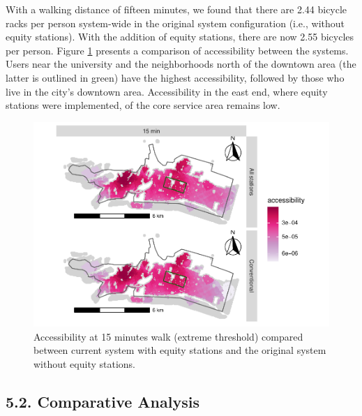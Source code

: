 \documentclass[]{elsarticle} %
\begin{document}
With a walking distance of fifteen minutes, we found that there are 2.44
bicycle racks per person system-wide in the original system
configuration (i.e., without equity stations). With the addition of
equity stations, there are now 2.55 bicycles per person. Figure
\ref{fig:figure-9} presents a comparison of accessibility between the
systems. Users near the university and the neighborhoods north of the
downtown area (the latter is outlined in green) have the highest
accessibility, followed by those who live in the city's downtown area.
Accessibility in the east end, where equity stations were implemented,
of the core service area remains low.

\begin{figure}

{\centering \includegraphics[width=0.9\linewidth]{Bike-share-spatial-equity_files/figure-latex/figure-9-1} 

}

\caption{Accessibility at 15 minutes walk (extreme threshold) compared between current system with equity stations and the original system without equity stations.}\label{fig:figure-9}
\end{figure}

\hypertarget{comparative-analysis}{%
\subsection{5.2. Comparative Analysis}\label{comparative-analysis}}
\end{document}
